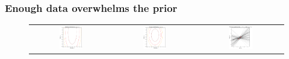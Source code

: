 
\begin{frame}
\frametitle{Enough data overwhelms the prior}
\vspace*{-0.2cm}
\begin{figure}
\begin{tabular}{ccc}
    \includegraphics[width=0.3\textwidth]{images/plots/w_space_posterior_sequence_002_likelihood.pdf} &
    \includegraphics[width=0.3\textwidth]{images/plots/w_space_posterior_sequence_002_posterior.pdf} &
    \includegraphics[width=0.3\textwidth]{images/plots/w_space_posterior_sequence_002_posterior_models.pdf} \\ 
    

\end{tabular}
\end{figure}
\end{frame}

